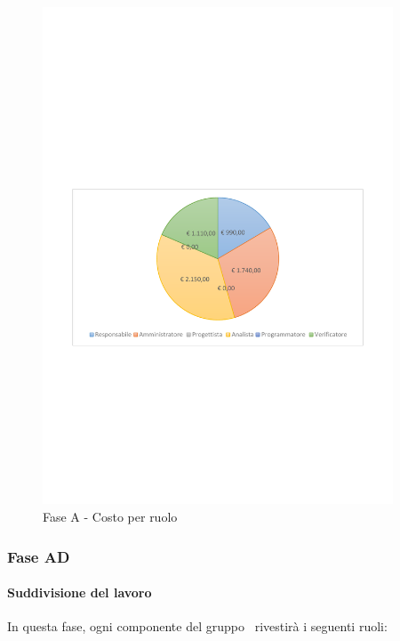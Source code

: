 \documentclass[../PianoProgetto.tex]{subfiles}
\begin{document}
	\begin{figure}[!h]
		\centering
		\includegraphics[width=0.93\textwidth , trim=2cm 9.5cm 2cm 11cm]{grafici/A/A-costo}
			\caption{Fase A - Costo per ruolo}
		\label{fig:CircleChart-faseA_costo}
	\end{figure}
\vfill
	
	\subsubsection{Fase AD}
				\paragraph{Suddivisione del lavoro}
					In questa fase\g, ogni componente del gruppo \leaf\ rivestirà i seguenti ruoli:
	
\end{document}
